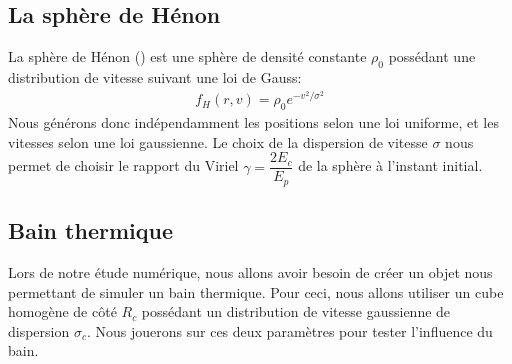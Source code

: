 



		\subsection{La sphère de Hénon}

			La sphère de Hénon (\cite{1964AnAp...27...83H}) est une sphère de densité
			constante $\rho_0$ possédant une distribution de vitesse suivant
			une loi de Gauss:
			\begin{align}
				f_H(r, v) = \rho_0 e^{-v^2/\sigma^2}
			\end{align}
			Nous générons donc indépendamment les positions selon une loi uniforme, et les vitesses selon
			une loi gaussienne. Le choix de la dispersion de vitesse $\sigma$ nous permet de choisir le rapport
			du Viriel $\gamma = \dfrac{2E_c}{E_p}$ de la sphère à l'instant initial.

		\subsection{Bain thermique}

			Lors de notre étude numérique, nous allons avoir besoin de créer un objet nous permettant de
			simuler un bain thermique. Pour ceci, nous allons utiliser un cube homogène de côté $R_c$
			possédant un distribution de vitesse gaussienne de dispersion $\sigma_c$.
			Nous jouerons sur ces deux paramètres pour tester l'influence du bain.

